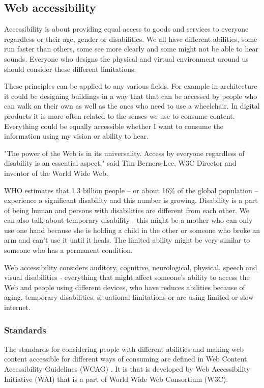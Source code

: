 \documentclass{master_thesis}
\begin{document}
\subsection{Web accessibility}

Accessibility is about providing equal access to goods and services to everyone regardless or their age, gender or disabilities. We all have different abilities, some run faster than others, some see more clearly and some might not be able to hear sounds. Everyone who designs the physical and virtual environment around us should consider these different limitations.

These principles can be applied to any various fields. For example in architecture it could be designing buildings in a way that that can be accessed by people who can walk on their own as well as the ones who need to use a wheelchair. In digital products it is more often related to the senses we use to consume content. Everything could be equally accessible whether I want to consume the information  using my vision or ability to hear.

"The power of the Web is in its universality. Access by everyone regardless of disability is an essential aspect," said Tim Berners-Lee, W3C Director and inventor of the World Wide Web\citep{WWWC1997}.

WHO estimates that 1.3 billion people – or about 16\% of the global population – experience a significant disability and this number is growing. Disability is a part of being human and persons with disabilities are different from each other. \citep{WHO2022} We can also talk about temporary disability - this might be a mother who can only use one hand because she is holding a child in the other or someone who broke an arm and can't use it until it heals. The limited ability might be very similar to someone who has a permanent condition.

Web accessibility considers auditory, cognitive, neurological, physical, speech and visual  disabilities - everything that might affect someone's ability to access the Web and people using different devices, who have reduces abilities because of aging, temporary disabilities, situational limitations or are using limited or slow internet. \citep{Henry2022}

\subsubsection{Standards}

The standards for considering people with different abilities and making web content accessible for different ways of consuming are defined in Web Content Accessibility Guidelines (WCAG) \citep{Kirkpatrick2018}. It is  that is developed by Web Accessibility Initiative (WAI) that is a part of World Wide Web Consortium (W3C).
\end{document}
